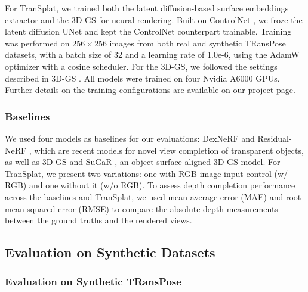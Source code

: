 For TranSplat, we trained both the latent diffusion-based surface embeddings extractor and the \ac{3D-GS} for neural rendering. Built on ControlNet \cite{zhang2023controlnet}, we froze the latent diffusion UNet and kept the ControlNet counterpart trainable. Training was performed on $256 \times 256$ images from both real and synthetic TRansPose datasets, with a batch size of 32 and a learning rate of 1.0e-6, using the AdamW optimizer with a cosine scheduler. For the \ac{3D-GS}, we followed the settings described in 3D-GS \cite{kerbl20233d}. All models were trained on four Nvidia A6000 GPUs. Further details on the training configurations are available on our project page.

\subsubsection{Baselines}

We used four models as baselines for our evaluations: DexNeRF \cite{ichnowski-2022-corl} and Residual-NeRF \cite{duisterhof2024residualnerf}, which are recent models for novel view completion of transparent objects, as well as \ac{3D-GS} \cite{kerbl20233d} and SuGaR \cite{guedon2024sugar}, an object surface-aligned \ac{3D-GS} model. For TranSplat, we present two variations: one with RGB image input control (w/ RGB) and one without it (w/o RGB). To assess depth completion performance across the baselines and TranSplat, we used mean average error (MAE) and root mean squared error (RMSE) to compare the absolute depth measurements between the ground truths and the rendered views.



\subsection{Evaluation on Synthetic Datasets}

\subsubsection{Evaluation on Synthetic TRansPose}



